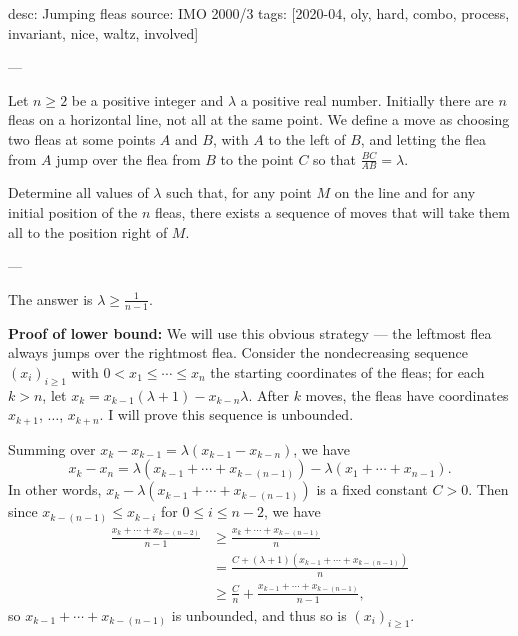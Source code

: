 desc: Jumping fleas
source: IMO 2000/3
tags: [2020-04, oly, hard, combo, process, invariant, nice, waltz, involved]

---

Let $n\ge2$ be a positive integer and $\lambda$ a positive real number. Initially there are $n$ fleas on a horizontal line, not all at the same point. We define a move as choosing two fleas at some points $A$ and $B$, with $A$ to the left of $B$, and letting the flea from $A$ jump over the flea from $B$ to the point $C$ so that $\frac{BC}{AB}=\lambda$.

Determine all values of $\lambda$ such that, for any point $M$ on the line and for any initial position of the $n$ fleas, there exists a sequence of moves that will take them all to the position right of $M$.

---

The answer is $\lambda\ge\frac1{n-1}$.

\bigskip

\textbf{Proof of lower bound:} We will use this obvious strategy --- the leftmost flea always jumps over the rightmost flea. Consider the nondecreasing sequence $(x_i)_{i\ge1}$ with $0<x_1\le\cdots\le x_n$ the starting coordinates of the fleas; for each $k>n$, let $x_k=x_{k-1}(\lambda+1)-x_{k-n}\lambda$. After $k$ moves, the fleas have coordinates $x_{k+1}$, $\ldots$, $x_{k+n}$. I will prove this sequence is unbounded.

Summing over $x_k-x_{k-1}=\lambda(x_{k-1}-x_{k-n})$, we have \[x_k-x_n=\lambda\left(x_{k-1}+\cdots+x_{k-(n-1)}\right)-\lambda(x_1+\cdots+x_{n-1}).\]
In other words, $x_k-\lambda\left(x_{k-1}+\cdots+x_{k-(n-1)}\right)$ is a fixed constant $C>0$. Then since $x_{k-(n-1)}\le x_{k-i}$ for $0\le i\le n-2$, we have
\begin{align*}
    \frac{x_k+\cdots+x_{k-(n-2)}}{n-1}&\ge\frac{x_k+\cdots+x_{k-(n-1)}}n\\
    &=\frac{C+(\lambda+1)\left(x_{k-1}+\cdots+x_{k-(n-1)}\right)}n\\
    &\ge\frac Cn+\frac{x_{k-1}+\cdots+x_{k-(n-1)}}{n-1},
\end{align*}
so $x_{k-1}+\cdots+x_{k-(n-1)}$ is unbounded, and thus so is $(x_i)_{i\ge1}$.

\bigskip

